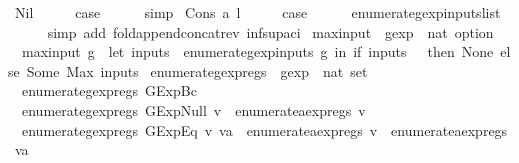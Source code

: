 \begin{isabellebody}
\ Nil\isanewline
\ \ \isamarkupfalse%
\ \isamarkupfalse%
\ {\isacharquery}case\isanewline
\ \ \ \ \isamarkupfalse%
\ simp\isanewline
{}\isamarkupfalse%
\isanewline
{}\isamarkupfalse%
\ {\isacharparenleft}Cons\ a\ l{\isacharparenright}\isanewline
\ \ \isamarkupfalse%
\ \isamarkupfalse%
\ {\isacharquery}case\isanewline
\ \ \ \ \isamarkupfalse%
\ enumerate{\isacharunderscore}gexp{\isacharunderscore}inputs{\isacharunderscore}list\isanewline
\ \ \ \ \isamarkupfalse%
\ {\isacharparenleft}simp\ add{\isacharcolon}\ fold{\isacharunderscore}append{\isacharunderscore}concat{\isacharunderscore}rev\ inf{\isacharunderscore}sup{\isacharunderscore}aci{\isacharparenleft}{}{\isacharparenright}{\isacharparenright}\isanewline
{}\isamarkupfalse%
%
\endisatagproof
{\isafoldproof}%
%
\isadelimproof
\isanewline
%
\endisadelimproof
\isanewline
{}\isamarkupfalse%
\ max{\isacharunderscore}input\ {\isacharcolon}{\isacharcolon}\ {\isachardoublequoteopen}gexp\ {\isasymRightarrow}\ nat\ option{\isachardoublequoteclose}\ \isanewline
\ \ {\isachardoublequoteopen}max{\isacharunderscore}input\ g\ {\isacharequal}\ {\isacharparenleft}let\ inputs\ {\isacharequal}\ {\isacharparenleft}enumerate{\isacharunderscore}gexp{\isacharunderscore}inputs\ g{\isacharparenright}\ in\ if\ inputs\ {\isacharequal}\ {\isacharbraceleft}{\isacharbraceright}\ then\ None\ else\ Some\ {\isacharparenleft}Max\ inputs{\isacharparenright}{\isacharparenright}{\isachardoublequoteclose}\isanewline
\isanewline
{}\isamarkupfalse%
\ enumerate{\isacharunderscore}gexp{\isacharunderscore}regs\ {\isacharcolon}{\isacharcolon}\ {\isachardoublequoteopen}gexp\ {\isasymRightarrow}\ nat\ set{\isachardoublequoteclose}\ \isanewline
\ \ {\isachardoublequoteopen}enumerate{\isacharunderscore}gexp{\isacharunderscore}regs\ {\isacharparenleft}GExp{\isachardot}Bc\ {\isacharunderscore}{\isacharparenright}\ {\isacharequal}\ {\isacharbraceleft}{\isacharbraceright}{\isachardoublequoteclose}\ {\isacharbar}\isanewline
\ \ {\isachardoublequoteopen}enumerate{\isacharunderscore}gexp{\isacharunderscore}regs\ {\isacharparenleft}GExp{\isachardot}Null\ v{\isacharparenright}\ {\isacharequal}\ enumerate{\isacharunderscore}aexp{\isacharunderscore}regs\ v{\isachardoublequoteclose}\ {\isacharbar}\isanewline
\ \ {\isachardoublequoteopen}enumerate{\isacharunderscore}gexp{\isacharunderscore}regs\ {\isacharparenleft}GExp{\isachardot}Eq\ v\ va{\isacharparenright}\ {\isacharequal}\ enumerate{\isacharunderscore}aexp{\isacharunderscore}regs\ v\ {\isasymunion}\ enumerate{\isacharunderscore}aexp{\isacharunderscore}regs\ va{\isachardoublequoteclose}\ {\isacharbar}\isanewline

\end{isabellebody}

